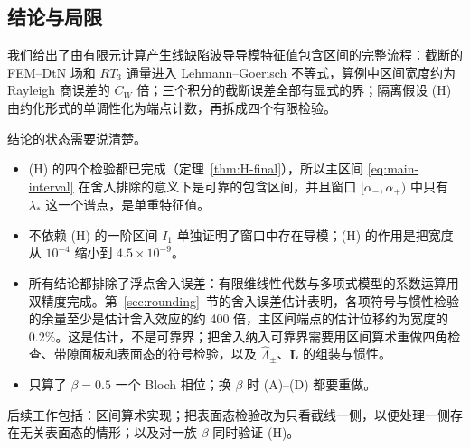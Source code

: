 \documentclass[11pt,a4paper,fontset=fandol]{ctexart}
\theoremstyle{plain}
\theoremstyle{definition}
\theoremstyle{remark}
\begin{document}
\subsection{结论与局限}
\label{sec:conclusion}
我们给出了由有限元计算产生线缺陷波导导模特征值包含区间的完整流程：截断的 FEM--DtN 场和 $RT_3$ 通量进入 Lehmann--Goerisch 不等式，算例中区间宽度约为 Rayleigh 商误差的 $C_W$ 倍；三个积分的截断误差全部有显式的界；隔离假设 (H) 由约化形式的单调性化为端点计数，再拆成四个有限检验。

结论的状态需要说清楚。
\begin{itemize}
\item (H) 的四个检验都已完成（定理~\ref{thm:H-final}），所以主区间 \eqref{eq:main-interval} 在舍入排除的意义下是可靠的包含区间，并且窗口 $[\alpha_-,\alpha_+)$ 中只有 $\lambda_*$ 这一个谱点，是单重特征值。
\item 不依赖 (H) 的一阶区间 $I_1$ 单独证明了窗口中存在导模；(H) 的作用是把宽度从 $10^{-4}$ 缩小到 $4.5\times10^{-9}$。
\item 所有结论都排除了浮点舍入误差：有限维线性代数与多项式模型的系数运算用双精度完成。第~\ref{sec:rounding}~节的舍入误差估计表明，各项符号与惯性检验的余量至少是估计舍入效应的约 400 倍，主区间端点的估计位移约为宽度的 $0.2\%$。这是估计，不是可靠界；把舍入纳入可靠界需要用区间算术重做四角检查、带隙面板和表面态的符号检验，以及 $\hat\Lambda_\pm$、$\bm L$ 的组装与惯性。
\item 只算了 $\beta=0.5$ 一个 Bloch 相位；换 $\beta$ 时 (A)--(D) 都要重做。
\end{itemize}

后续工作包括：区间算术实现；把表面态检验改为只看截线一侧，以便处理一侧存在无关表面态的情形；以及对一族 $\beta$ 同时验证 (H)。



\end{document}
